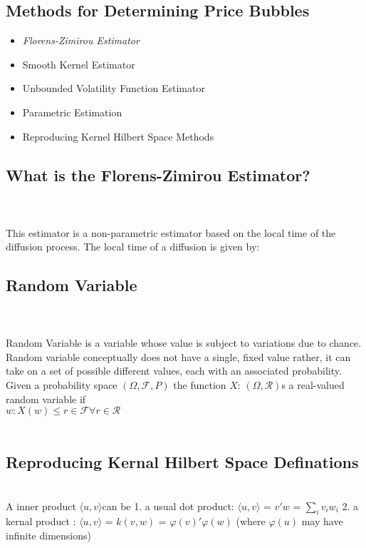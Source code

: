 \subsection{Methods for Determining Price Bubbles}
\begin{itemize}
\item \textit{Florens-Zimirou Estimator}
\item Smooth Kernel Estimator
\item Unbounded Volatility Function Estimator
\item Parametric Estimation
\item Reproducing Kernel Hilbert Space Methods
\end{itemize} 
\subsection{What is the Florens-Zimirou Estimator?}\\\\
This estimator is a non-parametric estimator based on the local time of the diffusion process.
The local time of a diffusion is given by:

\subsection{Random Variable }\\\\
Random Variable is a variable whose value is subject to variations due to chance. Random variable conceptually does not have a single, fixed value rather, it can take on a set of possible different values, each with an associated probability.\\

Given a probability space $\left( \Omega, \mathcal{F}, P \right) $ the function $X$: $\left( \Omega, \mathcal{R} \right)$s a real-valued random variable if\\
$w : X(w)\leq r\in \mathcal{F}           \forall r\in \mathcal{R}$\\\\

\subsection{Reproducing Kernal Hilbert Space Definations}\\

A inner product ${\langle u, v \rangle}$can be 
	1. a usual dot product: $\langle u, v \rangle$  = $v'w$ = $\sum_{i}v_{i}w_{i}$
	2. a kernal product : $\langle u, v \rangle$  = $k(v, w)$  = $ \varphi(v)'\varphi(w)$ (where $\varphi(u)$ may have infinite dimensions)\\\\
	
